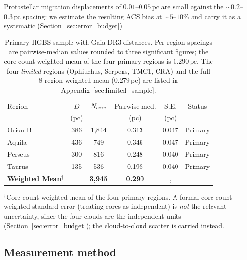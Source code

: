 \documentclass[usenatbib,twoside,twocolumn]{mnras}
\begin{document}
Protostellar migration displacements of $0.01$--$0.05$\,pc \citep{Kirk2016, Mattern2018} are small against the $\sim0.2$--$0.3$\,pc spacing; we estimate the resulting ACS bias at $\sim5$--$10\%$ and carry it as a systematic (Section~\ref{sec:error_budget}).

\begin{table}
\caption{Primary HGBS sample with Gaia DR3 distances. Per-region spacings are pairwise-median values rounded to three significant figures; the core-count-weighted mean of the four primary regions is $0.290$\,pc. The four \emph{limited} regions (Ophiuchus, Serpens, TMC1, CRA) and the full 8-region weighted mean ($0.279$\,pc) are listed in Appendix~\ref{sec:limited_sample}.}
\label{tab:sample}
\footnotesize
\setlength{\tabcolsep}{3pt}
\begin{tabular}{lccccc}
\toprule
Region & $D$ & $N_{\rm core}$ & Pairwise med. & S.E. & Status \\
       & (pc) &  & (pc) & (pc) &  \\
\midrule
Orion B  & 386 & 1,844 & 0.313 & 0.047 & Primary \\
Aquila   & 436 & 749   & 0.346 & 0.047 & Primary \\
Perseus  & 300 & 816   & 0.248 & 0.040 & Primary \\
Taurus   & 135 & 536   & 0.198 & 0.040 & Primary \\
\midrule
\textbf{Weighted Mean}$^\dagger$ &  & \textbf{3,945} & \textbf{0.290} &, &  \\
\bottomrule
\end{tabular}
\par\vspace{2pt}
\footnotesize $^\dagger$Core-count-weighted mean of the four primary regions. A formal core-count-weighted standard error (treating cores as independent) is \emph{not} the relevant uncertainty, since the four clouds are the independent units (Section~\ref{sec:error_budget}); the cloud-to-cloud scatter is carried instead.
\end{table}

\subsection{Measurement method}
\label{sec:methodology}
\end{document}
